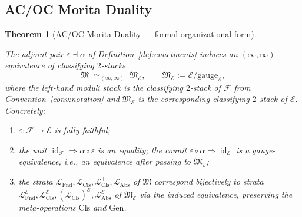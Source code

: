 \documentclass[11pt]{article}
\theoremstyle{plain}
\newtheorem{theorem}{Theorem}[section]
\theoremstyle{definition}
\newcommand{\cF}{\mathcal{F}}
\newcommand{\fM}{\mathfrak{M}}
\newcommand{\LFnd}{\mathcal{L}_{\mathrm{Fnd}}}
\newcommand{\LCls}{\mathcal{L}_{\mathrm{Cls}}}
\newcommand{\LClsMax}{\mathcal{L}_{\mathrm{Cls}}^{\top}}
\newcommand{\LAbs}{\mathcal{L}_{\mathrm{Abs}}}
\newcommand{\cE}{\mathcal{E}}
\DeclareMathOperator{\id}{id}
\begin{document}
\subsection{AC/OC Morita Duality}

\begin{theorem}[AC/OC Morita Duality --- formal-organizational form]\label{thm:ac-oc-duality}

The adjoint pair $\varepsilon \dashv \alpha$ of Definition~\ref{def:enactments} induces an $(\infty, \infty)$-equivalence of classifying $2$-stacks
\[
  \fM \;\simeq_{(\infty, \infty)}\; \fM_\cE, \qquad \fM_\cE := \cE / \mathrm{gauge}_\cE,
\]
where the left-hand moduli stack is the classifying $2$-stack of $\cF$ from Convention~\ref{conv:notation} and $\fM_\cE$ is the corresponding classifying $2$-stack of $\cE$. Concretely:
\begin{enumerate}[label=(\alph*)]
\item $\varepsilon : \cF \to \cE$ is fully faithful;
\item the unit $\id_\cF \Rightarrow \alpha \circ \varepsilon$ is an equality; the counit $\varepsilon \circ \alpha \Rightarrow \id_\cE$ is a gauge-equivalence, i.e., an equivalence after passing to $\fM_\cE$;
\item the strata $\LFnd, \LCls, \LClsMax, \LAbs$ of $\fM$ correspond bijectively to strata $\LFnd^\cE, \LCls^\cE, (\LClsMax)^\cE, \LAbs^\cE$ of $\fM_\cE$ via the induced equivalence, preserving the meta-operations $\mathrm{Cls}$ and $\mathrm{Gen}$.
\end{enumerate}
\end{theorem}
\end{document}
